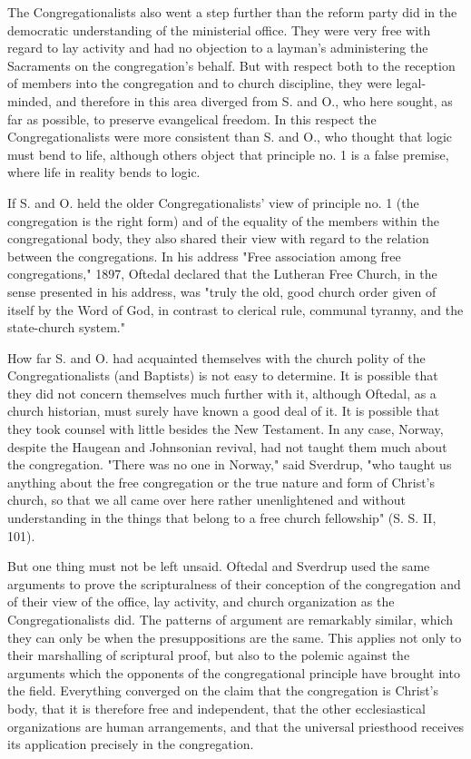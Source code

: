 The Congregationalists also went a step further than the reform party did in the democratic understanding of the ministerial office. They were very free with regard to lay activity and had no objection to a layman’s administering the Sacraments on the congregation’s behalf. But with respect both to the reception of members into the congregation and to church discipline, they were legal-minded, and therefore in this area diverged from S. and O., who here sought, as far as possible, to preserve evangelical freedom. In this respect the Congregationalists were more consistent than S. and O., who thought that logic must bend to life, although others object that principle no. 1 is a false premise, where life in reality bends to logic.

If S. and O. held the older Congregationalists’ view of principle no. 1 (the congregation is the right form) and of the equality of the members within the congregational body, they also shared their view with regard to the relation between the congregations. In his address "Free association among free congregations," 1897, Oftedal declared that the Lutheran Free Church, in the sense presented in his address, was "truly the old, good church order given of itself by the Word of God, in contrast to clerical rule, communal tyranny, and the state-church system."

How far S. and O. had acquainted themselves with the church polity of the Congregationalists (and Baptists) is not easy to determine. It is possible that they did not concern themselves much further with it, although Oftedal, as a church historian, must surely have known a good deal of it. It is possible that they took counsel with little besides the New Testament. In any case, Norway, despite the Haugean and Johnsonian revival, had not taught them much about the congregation. "There was no one in Norway," said Sverdrup, "who taught us anything about the free congregation or the true nature and form of Christ’s church, so that we all came over here rather unenlightened and without understanding in the things that belong to a free church fellowship" (S. S. II, 101).

But one thing must not be left unsaid. Oftedal and Sverdrup used the same arguments to prove the scripturalness of their conception of the congregation and of their view of the office, lay activity, and church organization as the Congregationalists did. The patterns of argument are remarkably similar, which they can only be when the presuppositions are the same. This applies not only to their marshalling of scriptural proof, but also to the polemic against the arguments which the opponents of the congregational principle have brought into the field. Everything converged on the claim that the congregation is Christ’s body, that it is therefore free and independent, that the other ecclesiastical organizations are human arrangements, and that the universal priesthood receives its application precisely in the congregation.

